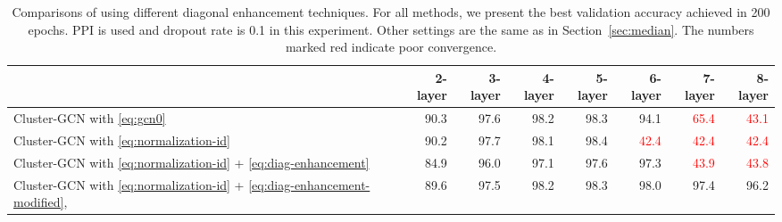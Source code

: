 \documentclass[sigconf]{acmart}
\begin{document}
\begin{table*}
\caption{Comparisons of using different diagonal enhancement techniques. For all methods, we present the best validation accuracy achieved in 200 epochs. PPI is used and dropout rate is 0.1 in this experiment. Other settings are the same as in Section~\ref{sec:median}. The numbers marked red indicate poor convergence.}
  \centering
  \renewcommand\bfdefault{b}
  \vspace{-10pt}
  \begin{tabular}{|l|r|r|r|r|r|r|r|}
  \hline
   & 2-layer & 3-layer & 4-layer & 5-layer & 6-layer & 7-layer & 8-layer\\
  \hline
Cluster-GCN with \eqref{eq:gcn0}  &  90.3  & 97.6 & 98.2  & 98.3 & 94.1 & \textcolor{red}{65.4}  & \textcolor{red}{43.1}\\
  \hline
  Cluster-GCN with \eqref{eq:normalization-id}   & 90.2   & 97.7   & 98.1   & 98.4  & \textcolor{red}{42.4} & \textcolor{red}{42.4} & \textcolor{red}{42.4}\\
  \hline
  Cluster-GCN with \eqref{eq:normalization-id} + \eqref{eq:diag-enhancement}   &  84.9  & 96.0   & 97.1   & 97.6  & 97.3 & \textcolor{red}{43.9} & \textcolor{red}{43.8}\\
  \hline
  Cluster-GCN with \eqref{eq:normalization-id} + \eqref{eq:diag-enhancement-modified},    & 89.6   & 97.5   & 98.2   & 98.3  & 98.0 & 97.4 & 96.2\\
  \hline
\end{tabular}
\label{tab:deep-accuracy}
\end{table*}
\end{document}

